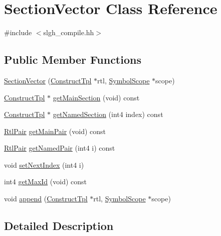 \hypertarget{class_section_vector}{}\section{Section\+Vector Class Reference}
\label{class_section_vector}


{\ttfamily \#include $<$slgh\+\_\+compile.\+hh$>$}

\subsection*{Public Member Functions}
\begin{DoxyCompactItemize}
\item 
\mbox{\hyperlink{class_section_vector_aeaabad6fe82b91f5d229affae85e60da}{Section\+Vector}} (\mbox{\hyperlink{class_construct_tpl}{Construct\+Tpl}} $\ast$rtl, \mbox{\hyperlink{class_symbol_scope}{Symbol\+Scope}} $\ast$scope)
\item 
\mbox{\hyperlink{class_construct_tpl}{Construct\+Tpl}} $\ast$ \mbox{\hyperlink{class_section_vector_a997580aa88cc1f26aabc9317ccd3d035}{get\+Main\+Section}} (void) const
\item 
\mbox{\hyperlink{class_construct_tpl}{Construct\+Tpl}} $\ast$ \mbox{\hyperlink{class_section_vector_a5c581abab0689b485d9e6c567e5d606d}{get\+Named\+Section}} (int4 index) const
\item 
\mbox{\hyperlink{struct_rtl_pair}{Rtl\+Pair}} \mbox{\hyperlink{class_section_vector_af36cf99932d7673a42e2fef0d1587f47}{get\+Main\+Pair}} (void) const
\item 
\mbox{\hyperlink{struct_rtl_pair}{Rtl\+Pair}} \mbox{\hyperlink{class_section_vector_a01124141c2c503818d5728ecb202712c}{get\+Named\+Pair}} (int4 i) const
\item 
void \mbox{\hyperlink{class_section_vector_a1bffcc372bb98f06fcfabdeddd068019}{set\+Next\+Index}} (int4 i)
\item 
int4 \mbox{\hyperlink{class_section_vector_a1656d5dbb035df63c1c943bdf5e8191a}{get\+Max\+Id}} (void) const
\item 
void \mbox{\hyperlink{class_section_vector_a76c623f1984fcb88dc141d85066a97c6}{append}} (\mbox{\hyperlink{class_construct_tpl}{Construct\+Tpl}} $\ast$rtl, \mbox{\hyperlink{class_symbol_scope}{Symbol\+Scope}} $\ast$scope)
\end{DoxyCompactItemize}


\subsection{Detailed Description}


